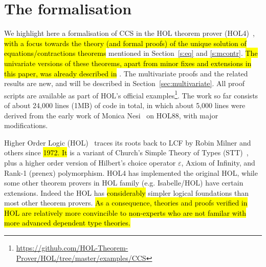 
\newcommand\fun{{\to}}
\newcommand\prd{{\times}}
\newcommand{\ty}[1]{\textsl{#1}}
\newcommand\conj{\ \wedge\ }
\newcommand\disj{\ \vee\ }
\newcommand\imp{ \Rightarrow }
\newcommand\eqv{\ \equiv\ }
\newcommand\vbar{\mid}
\newcommand\turn{\ \vdash\ } %
\newcommand\hilbert{\varepsilon}
\newcommand{\uquant}[1]{\forall #1.\ }
\newcommand{\equant}[1]{\exists #1.\ }
\newcommand{\hquant}[1]{\hilbert #1.\ }
\newcommand{\iquant}[1]{\exists ! #1.\ }
\newcommand{\lquant}[1]{\lambda #1.\ }
\newcommand{\ml}[1]{\mbox{{\def\_{\char'137}\texttt{#1}}}}
\newcommand{\con}[1]{\mathrm{#1}}

\newcommand\bool{\ty{bool}}
\newcommand\num{\ty{num}}
\newcommand\ind{\ty{ind}}
\newcommand\lst{\ty{list}}

\providecommand{\T}{\con{T}}
\renewcommand{\T}{\con{T}}
\newcommand\F{\con{F}}
\newcommand\OneOne{\con{One\_One}}
\newcommand\OntoSubset{\con{Onto\_Subset}}
\newcommand\Onto{\con{Onto}}
\newcommand\TyDef{\con{Type\_Definition}}

\section{The formalisation}
\label{s:for}

We highlight here a formalisation of CCS in the HOL theorem prover
(HOL4)~\cite{Melham:1993vl,slind2008brief}, \hl{with a focus towards the
theory (and formal proofs) of the unique solution of
equations/contractions theorems} mentioned in Section~\ref{s:eq} and
\ref{s:mcontr}.
\hl{The univariate versions of these theorems, apart from minor fixes and
extensions in this paper, was already described in}
\cite{Tian:2017wrba}. The multivariate proofs and the related results
are new, and will be described in Section~\ref{sec:multivariate}.
All proof scripts are available as part of HOL's official
examples\footnote{\url{https://github.com/HOL-Theorem-Prover/HOL/tree/master/examples/CCS}}.
The work so far consists of about 24,000 lines (1MB) of code in total,
in which about 5,000 lines were derived from the early work of Monica
Nesi~\cite{Nesi:1992ve} on HOL88, with major modifications.

Higher Order Logic (HOL)~\cite{hollogic} traces
its roots back to LCF
\cite{gordon1979edinburgh,milner1972logic} by Robin Milner and others
since \hl{1972. It} is a variant of
Church’s Simple Theory of Types (STT)~\cite{church1940formulation},
plus a higher order version of Hilbert's choice operator $\varepsilon$,
Axiom of Infinity, and Rank-1 (prenex) polymorphism.
HOL4 has implemented the original HOL, 
while some other theorem provers in HOL family (e.g. Isabelle/HOL) have
certain extensions.
Indeed the HOL has \hl{considerably} simpler logical
foundations than most other theorem provers. %
\hl{As a consequence, theories and proofs verified in HOL are relatively more
convincible to non-experts who are not familar with more advanced
dependent type theories.}

